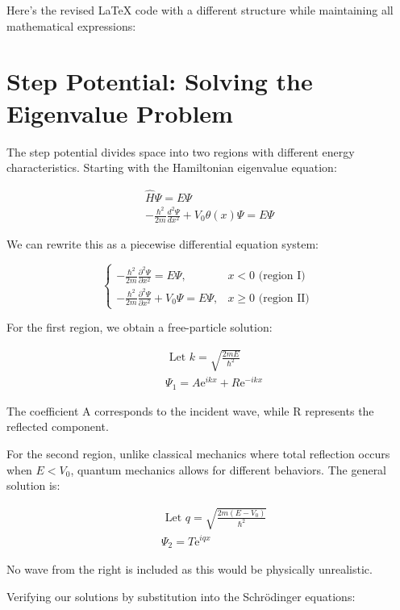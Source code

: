 Here's the revised LaTeX code with a different structure while maintaining all mathematical expressions:


\section{Step Potential: Solving the Eigenvalue Problem}

The step potential divides space into two regions with different energy characteristics. Starting with the Hamiltonian eigenvalue equation:

\begin{gather}
\hat{H} \Psi=E \Psi  \\
-\frac{\hbar^{2}}{2 m} \frac{d^{2} \Psi}{d x^{2}}+V_{0} \theta(x) \Psi=E \Psi
\end{gather}

We can rewrite this as a piecewise differential equation system:

\[
\begin{cases}-\frac{\hbar^{2}}{2 m} \frac{\partial^{2} \Psi}{\partial x^{2}}=E \Psi, & x<0 \text { (region I) }  \\ -\frac{\hbar^{2}}{2 m} \frac{\partial^{2} \Psi}{\partial x^{2}}+V_{0} \Psi=E \Psi, & x \geq 0 \text { (region II) }\end{cases}
\]

For the first region, we obtain a free-particle solution:

\begin{align}
& \text { Let } k=\sqrt{\frac{2 m E}{\hbar^{2}}}  \\
& \Psi_{1}=A \mathrm{e}^{i k x}+R \mathrm{e}^{-i k x}
\end{align}

The coefficient A corresponds to the incident wave, while R represents the reflected component.

For the second region, unlike classical mechanics where total reflection occurs when $E < V_0$, quantum mechanics allows for different behaviors. The general solution is:

\begin{align}
& \text { Let } q=\sqrt{\frac{2 m\left(E-V_{0}\right)}{\hbar^{2}}}  \\
& \Psi_{2}=T \mathrm{e}^{i q x}
\end{align}

No wave from the right is included as this would be physically unrealistic.

Verifying our solutions by substitution into the Schrödinger equations:

